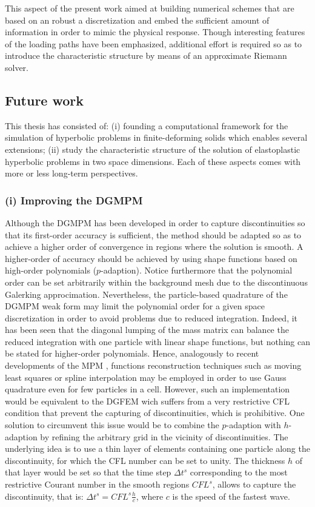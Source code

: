 This aspect of the present work aimed at building numerical schemes that are based on an robust a discretization and embed the sufficient amount of information in order to mimic the physical response.
Though interesting features of the loading paths have been emphasized, additional effort is required so as to introduce the characteristic structure by means of an approximate Riemann solver.


\subsection*{Future work}
This thesis has consisted of: (i) founding a computational framework for the simulation of hyperbolic problems in finite-deforming solids which enables several extensions; (ii) study the characteristic structure of the solution of elastoplastic hyperbolic problems in two space dimensions.
Each of these aspects comes with more or less long-term perspectives.

\subsubsection*{(i) Improving the DGMPM}
Although the DGMPM has been developed in order to capture discontinuities so that its first-order accuracy is sufficient, the method should be adapted so as to achieve a higher order of convergence in regions where the solution is smooth.
A higher-order of accuracy should be achieved by using shape functions based on high-order polynomials ($p$-adaption).
Notice furthermore that the polynomial order can be set arbitrarily within the background mesh due to the discontinuous Galerking approcimation.
Nevertheless, the particle-based quadrature of the DGMPM weak form may limit the polynomial order for a given space discretization in order to avoid problems due to reduced integration.
Indeed, it has been seen that the diagonal lumping of the mass matrix can balance the reduced integration with one particle with linear shape functions, but nothing can be stated for higher-order polynomials.
Hence, analogously to recent developments of the MPM \cite{MPM_BSpline1,MPM_BSpline2,IMPM}, functions reconstruction techniques such as moving least squares or spline interpolation may be employed in order to use Gauss quadrature even for few particles in a cell.
However, such an implementation would be equivalent to the DGFEM wich suffers from a very restrictive CFL condition that prevent the capturing of discontinuities, which is prohibitive.
One solution to circumvent this issue would be to combine the $p$-adaption with $h$-adaption by refining the arbitrary grid in the vicinity of discontinuities.
The underlying idea is to use a thin layer of elements containing one particle along the discontinuity, for which the CFL number can be set to unity.
The thickness $h$ of that layer would be set so that the time step $\Delta t^s$ corresponding to the most restrictive Courant number in the smooth regions $CFL^s$, allows to capture the discontinuity, that is: $\Delta t^s = CFL^s \frac{h}{c}$, where $c$ is the speed of the fastest wave.

